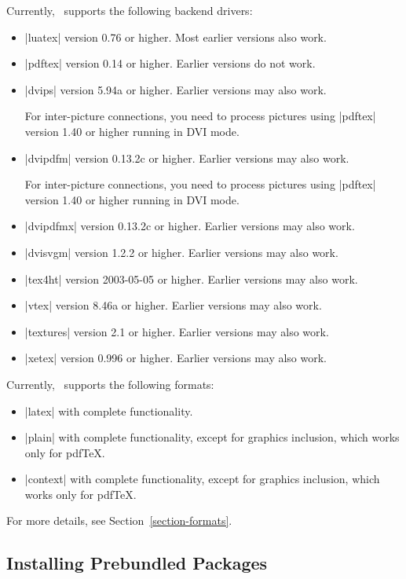 Currently, \pgfname\ supports the following backend drivers:
%
\begin{itemize}
    \item |luatex| version 0.76 or higher. Most earlier versions also work.
    \item |pdftex| version 0.14 or higher. Earlier versions do not work.
    \item |dvips| version 5.94a or higher. Earlier versions may also work.

        For inter-picture connections, you need to process pictures using
        |pdftex| version 1.40 or higher running in DVI mode.
    \item |dvipdfm| version 0.13.2c or higher. Earlier versions may also
        work.

        For inter-picture connections, you need to process pictures using
        |pdftex| version 1.40 or higher running in DVI mode.
    \item |dvipdfmx| version 0.13.2c or higher. Earlier versions may also
        work.
    \item |dvisvgm| version 1.2.2 or higher. Earlier versions may also work.
    \item |tex4ht| version 2003-05-05 or higher. Earlier versions may also
        work.
    \item |vtex| version 8.46a or higher. Earlier versions may also work.
    \item |textures| version 2.1 or higher. Earlier versions may also work.
    \item |xetex| version 0.996 or higher. Earlier versions may also work.
\end{itemize}

Currently, \pgfname\ supports the following formats:
%
\begin{itemize}
    \item |latex| with complete functionality.
    \item |plain| with complete functionality, except for graphics inclusion,
        which works only for pdf\TeX.
    \item |context| with complete functionality, except for graphics
        inclusion, which works only for pdf\TeX.
\end{itemize}

For more details, see Section~\ref{section-formats}.


\subsection{Installing Prebundled Packages}

